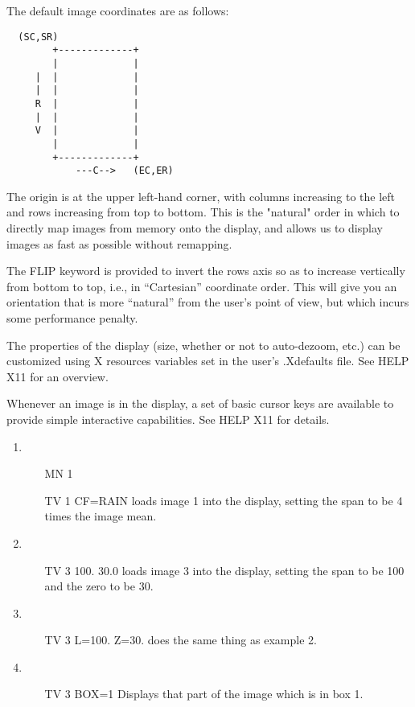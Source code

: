 The default image coordinates are as follows:
\begin{verbatim} 
  (SC,SR)
        +-------------+
        |             |
     |  |             |
     |  |             |
     R  |             |
     |  |             |
     V  |             |
        |             |
        +-------------+
            ---C-->   (EC,ER)
\end{verbatim}

The origin is at the upper left-hand corner, with columns increasing to the
left and rows increasing from top to bottom.  This is the "natural" order
in which to directly map images from memory onto the display, and allows us
to display images as fast as possible without remapping.
 
The FLIP keyword is provided to invert the rows axis so as to increase
vertically from bottom to top, i.e., in ``Cartesian'' coordinate order.
This will give you an orientation that is more ``natural'' from the user's
point of view, but which incurs some performance penalty.
 
The properties of the display (size, whether or not to auto-dezoom, etc.)
can be customized using X resources variables set in the user's .Xdefaults
file.  See HELP X11 for an overview.
 
Whenever an image is in the display, a set of basic cursor keys are
available to provide simple interactive capabilities.  See HELP X11 for
details.
 
\begin{enumerate}
  \item{
\begin{itemize}
  \item[MN 1\hfill]{}
  \item[TV 1 CF=RAIN\hfill]{loads image 1 into the display, setting the
       span to be 4 times the image mean.}
\end{itemize}
}
  \item{
\begin{itemize}
  \item[TV 3 100. 30.0\hfill]{loads image 3 into the display, setting the
       span to be 100 and the zero to be 30.}
\end{itemize}
}
  \item{
\begin{itemize}
  \item[TV 3 L=100. Z=30.\hfill]{does the same thing as example 2.}
\end{itemize}
}
  \item{
\begin{itemize}
  \item[TV 3 BOX=1\hfill]{Displays that part of the image
       which is in box 1.}
\end{itemize}
}
\end{enumerate}

